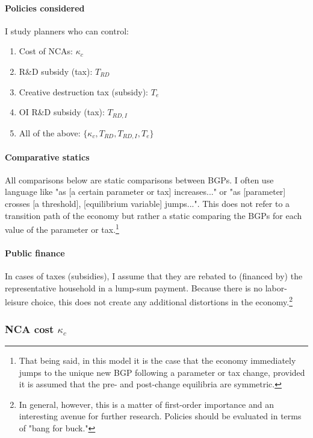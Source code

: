 \documentclass[11pt,english]{article}
\begin{document}
\paragraph{Policies considered} 

I study planners who can control:

\begin{enumerate}
	\item Cost of NCAs: $\kappa_c$ 
	\item R\&D subsidy (tax): $T_{RD}$
	\item Creative destruction tax (subsidy): $T_e$
	\item OI R\&D subsidy (tax): $T_{RD,I}$
	\item All of the above: $\{\kappa_c, T_{RD}, T_{RD,I}, T_e\}$
\end{enumerate}

\paragraph{Comparative statics}

All comparisons below are static comparisons between BGPs. I often use language like "as [a certain parameter or tax] increases..." or "as [parameter] crosses [a threshold], [equilibrium variable] jumps...". This does not refer to a transition path of the economy but rather a static comparing the BGPs for each value of the parameter or tax.\footnote{That being said, in this model it is the case that the economy immediately jumps to the unique new BGP following a parameter or tax change, provided it is assumed that the pre- and post-change equilibria are symmetric.}

\paragraph{Public finance} 

In cases of taxes (subsidies), I assume that they are rebated to (financed by) the representative household in a lump-sum payment. Because there is no labor-leisure choice, this does not create any additional distortions in the economy.\footnote{In general, however, this is a matter of first-order importance and an interesting avenue for further research. Policies should be evaluated in terms of "bang for buck."}

\subsubsection{NCA cost $\kappa_c$} 
\end{document}
